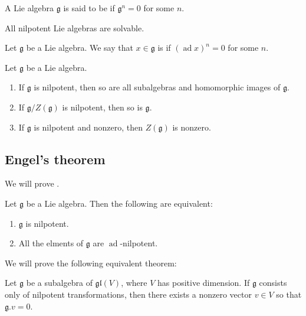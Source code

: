 \documentclass{article}
\newcommand*\ad{\operatorname{ad}}
\newcommand*\frkg{{\ensuremath{\mathfrak{g}}}}
\newcommand*\gl{\ensuremath{\mathfrak{gl}}}
\newcommand*\acts{.}
\begin{document}
\begin{definition}
    A Lie algebra $\frkg$ is said to be  if $\frkg^n = 0$ for some $n$.
\end{definition}

\begin{proposition}
    All nilpotent Lie algebras are solvable.
\end{proposition}

\begin{definition}
    Let $\frkg$ be a Lie algebra.
    We say that $x \in \frkg$ is  if $(\ad x)^n = 0$ for some $n$.
\end{definition}

\begin{theorem}
    \label{thm:NilpotencyStructuralResults}
    Let $\frkg$ be a Lie algebra.
    \begin{enumerate}[label=(\alph*)]
        \item 
            If $\frkg$ is nilpotent, then so are all subalgebras and homomorphic images of $\frkg$.
        \item 
            If $\frkg/Z(\frkg)$ is nilpotent, then so is $\frkg$.
        \item 
            If $\frkg$ is nilpotent and nonzero, then $Z(\frkg)$ is nonzero.
    \end{enumerate}
\end{theorem}

\subsection{Engel's theorem \cite[\S 3.3]{Hum72}}

We will prove .

\begin{theorem}
    [Engel]
    \label{thm:Engels}
    Let $\frkg$ be a Lie algebra.
    Then the following are equivalent:
    \begin{enumerate}[label=(\roman*)]
        \item 
            $\frkg$ is nilpotent.
        \item 
            All the elments of $\frkg$ are $\ad$-nilpotent.
    \end{enumerate}
\end{theorem}

We will prove the following equivalent theorem:

\begin{theorem}
    \label{thm:EngelsCommonEigenvector}
    Let $\frkg$ be a subalgebra of $\gl(V)$, where $V$ has positive dimension.
    If $\frkg$ consists only of nilpotent transformations, then there exists a nonzero vector $v \in V$ so that $\frkg \acts v = 0$.
\end{theorem}
\end{document}
